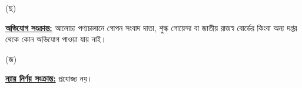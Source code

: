 \documentclass[12pt]{article}
\begin{document}
\begin{minipage}[t]{0.05\linewidth}
\hspace{1em}
\end{minipage}
\begin{minipage}[t]{0.05\linewidth}
(ছ)
\end{minipage}
\begin{minipage}[t]{0.90\linewidth}
\underline{\textbf{অভিযোগ সংক্রান্ত:}} আলোচ্য পণ্যচালানে
গোপন সংবাদ দাতা, শুল্ক গোয়েন্দা বা
জাতীয় রাজস্ব বোর্ডের কিংবা অন্য দপ্তর থেকে
কোন অভিযোগ পাওয়া যায় নাই।
\\
\end{minipage}
\begin{minipage}[t]{0.05\linewidth}
\hspace{1em}
\end{minipage}
\begin{minipage}[t]{0.05\linewidth}
(জ)
\end{minipage}
\begin{minipage}[t]{0.90\linewidth}
\underline{\textbf{ন্যায় নির্ণয় সংক্রান্ত:}} প্রযোজ্য নয়।
\\
\end{minipage}
\end{document}
